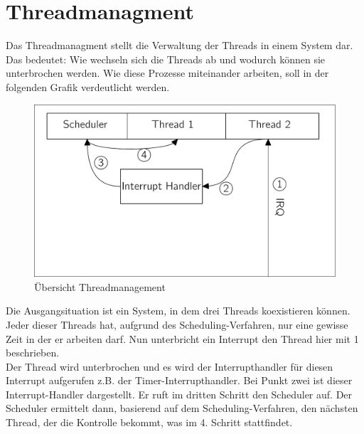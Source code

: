 \section{Threadmanagment}
Das Threadmanagment stellt die Verwaltung der Threads in einem System dar. Das bedeutet: Wie wechseln sich die Threads ab und wodurch k\"onnen sie unterbrochen werden. Wie diese Prozesse miteinander arbeiten, soll in der folgenden Grafik verdeutlicht werden.
\begin{figure}[H]
	\begin{center}	
	\caption{\"Ubersicht Threadmanagement}
	\includegraphics[scale=0.60]{common/draftconcrete-thread-managment.pdf}
	\end{center}
\end{figure}\noindent
Die Ausgangsituation ist ein System, in dem drei Threads koexistieren k\"onnen. Jeder dieser Threads hat, aufgrund des Scheduling-Verfahren, nur eine gewisse Zeit in der er arbeiten darf. Nun unterbricht ein Interrupt den Thread \textendash hier mit 1 beschrieben. \\
Der Thread wird unterbrochen und es wird der Interrupthandler f\"ur diesen Interrupt aufgerufen \textendash  z.B. der Timer-Interrupthandler. Bei Punkt zwei ist dieser Interrupt-Handler dargestellt. Er ruft im dritten Schritt den Scheduler auf. Der Scheduler ermittelt dann, basierend auf dem Scheduling-Verfahren, den n\"achsten Thread, der die Kontrolle bekommt, was im 4. Schritt stattfindet. 
